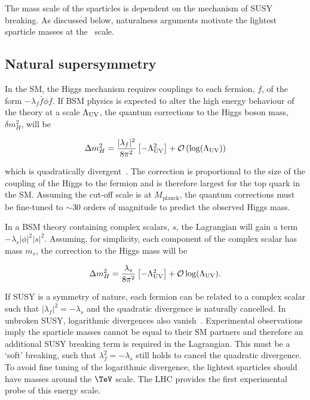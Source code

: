 The mass scale of the sparticles is dependent on the mechanism of SUSY breaking.
As discussed below, naturalness arguments motivate the lightest sparticle masses 
at the \TeV~scale.

\subsection{Natural supersymmetry}
\label{sec:natSUSY}
In the SM, the Higgs mechanism requires couplings to each fermion, $f$, of the form $-\lambda_{f}\bar{f}\phi f$. If BSM physics
is expected to alter the high energy behaviour of the theory at a scale $\Lambda_{\mathrm{UV}}$, the quantum corrections 
to the Higgs boson mass, $\delta m^2_{H}$, will be 

\begin{equation}
\Delta m^2_H =  \frac{|\lambda_f|^2}{8\pi^2}\left[-\Lambda^2_{\text{UV}}\right] + \mathcal{O}\left(\log(\Lambda_{\mathrm{UV}})\right)
\end{equation}

\noindent which is quadratically divergent~\cite{SUSYP}. The correction is proportional to the size of the coupling of the Higgs to the fermion 
and is therefore largest for the top quark in the SM. Assuming the cut-off scale is at $M_{\text{planck}}$, the quantum 
corrections must be fine-tuned to $\sim 30$ orders of magnitude to predict the observed Higgs mass. 

In a BSM theory containing complex scalars, $s$, the Lagrangian will gain a term $-\lambda_{s}|\phi|^2|s|^2$.
Assuming, for simplicity, each component of the complex scalar has mass $m_s$, the correction to the Higgs mass will be

\begin{equation}
\label{equ:corrHiggsSusy}
\Delta m^2_H =  \frac{\lambda_s}{8\pi^2}\left[-\Lambda^2_{\text{UV}}\right] + \mathcal{O}\log(\Lambda_{\mathrm{UV}}).
\end{equation}

If SUSY is a symmetry of nature, each fermion can be related to a complex scalar such that $|\lambda_f|^2 = -\lambda_s$ 
and the quadratic divergence is naturally cancelled. In unbroken SUSY, logarithmic divergences also vanish~\cite{SUSYP}. 
Experimental observations imply the sparticle masses cannot be equal to their SM partners and
therefore an additional SUSY breaking term is required in the Lagrangian. This must be a `soft' breaking,
such that $\lambda_f^2 = -\lambda_s$ still holds to cancel the quadratic divergence.
To avoid fine tuning of the logarithmic divergence, the lightest sparticles should have 
masses around the $\TeV$ scale. The LHC provides the first experimental probe of this energy scale.

